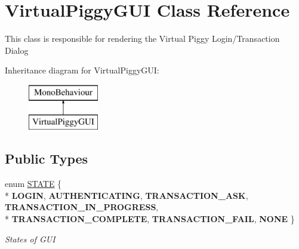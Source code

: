 \hypertarget{class_virtual_piggy_g_u_i}{\section{Virtual\-Piggy\-G\-U\-I Class Reference}
\label{class_virtual_piggy_g_u_i}
}


This class is responsible for rendering the Virtual Piggy Login/\-Transaction Dialog  


Inheritance diagram for Virtual\-Piggy\-G\-U\-I\-:\begin{figure}[H]
\begin{center}
\leavevmode
\includegraphics[height=2.000000cm]{class_virtual_piggy_g_u_i}
\end{center}
\end{figure}
\subsection*{Public Types}
\begin{DoxyCompactItemize}
\item 
enum \hyperlink{class_virtual_piggy_g_u_i_acfc203ccd9a2018fb6c1e53ebe244c8d}{S\-T\-A\-T\-E} \{ \\*
{\bfseries L\-O\-G\-I\-N}, 
{\bfseries A\-U\-T\-H\-E\-N\-T\-I\-C\-A\-T\-I\-N\-G}, 
{\bfseries T\-R\-A\-N\-S\-A\-C\-T\-I\-O\-N\-\_\-\-A\-S\-K}, 
{\bfseries T\-R\-A\-N\-S\-A\-C\-T\-I\-O\-N\-\_\-\-I\-N\-\_\-\-P\-R\-O\-G\-R\-E\-S\-S}, 
\\*
{\bfseries T\-R\-A\-N\-S\-A\-C\-T\-I\-O\-N\-\_\-\-C\-O\-M\-P\-L\-E\-T\-E}, 
{\bfseries T\-R\-A\-N\-S\-A\-C\-T\-I\-O\-N\-\_\-\-F\-A\-I\-L}, 
{\bfseries N\-O\-N\-E}
 \}
\begin{DoxyCompactList}\small\item\em States of G\-U\-I \end{DoxyCompactList}\end{DoxyCompactItemize}
